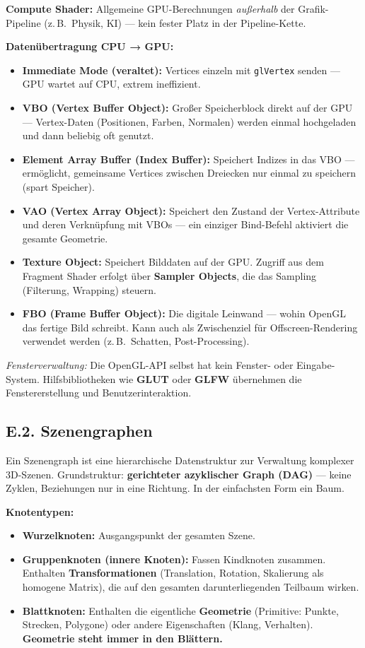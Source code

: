 \documentclass[12pt, a4paper]{article}
\begin{document}
\textbf{Compute Shader:} Allgemeine GPU-Berechnungen \textit{außerhalb} der Grafik-Pipeline (z.\,B.\ Physik, KI) — kein fester Platz in der Pipeline-Kette.

\medskip
\textbf{Datenübertragung CPU → GPU:}

\begin{itemize}
  \item \textbf{Immediate Mode (veraltet):} Vertices einzeln mit \texttt{glVertex} senden — GPU wartet auf CPU, extrem ineffizient.
  \item \textbf{VBO (Vertex Buffer Object):} Großer Speicherblock direkt auf der GPU — Vertex-Daten (Positionen, Farben, Normalen) werden einmal hochgeladen und dann beliebig oft genutzt.
  \item \textbf{Element Array Buffer (Index Buffer):} Speichert Indizes in das VBO — ermöglicht, gemeinsame Vertices zwischen Dreiecken nur einmal zu speichern (spart Speicher).
  \item \textbf{VAO (Vertex Array Object):} Speichert den Zustand der Vertex-Attribute und deren Verknüpfung mit VBOs — ein einziger Bind-Befehl aktiviert die gesamte Geometrie.
  \item \textbf{Texture Object:} Speichert Bilddaten auf der GPU. Zugriff aus dem Fragment Shader erfolgt über \textbf{Sampler Objects}, die das Sampling (Filterung, Wrapping) steuern.
  \item \textbf{FBO (Frame Buffer Object):} Die digitale Leinwand — wohin OpenGL das fertige Bild schreibt. Kann auch als Zwischenziel für Offscreen-Rendering verwendet werden (z.\,B.\ Schatten, Post-Processing).
\end{itemize}

\textit{Fensterverwaltung:} Die OpenGL-API selbst hat kein Fenster- oder Eingabe-System. Hilfsbibliotheken wie \textbf{GLUT} oder \textbf{GLFW} übernehmen die Fenstererstellung und Benutzerinteraktion.

\subsection*{E.2. Szenengraphen}

Ein Szenengraph ist eine hierarchische Datenstruktur zur Verwaltung komplexer 3D-Szenen. Grundstruktur: \textbf{gerichteter azyklischer Graph (DAG)} — keine Zyklen, Beziehungen nur in eine Richtung. In der einfachsten Form ein Baum.

\textbf{Knotentypen:}
\begin{itemize}
  \item \textbf{Wurzelknoten:} Ausgangspunkt der gesamten Szene.
  \item \textbf{Gruppenknoten (innere Knoten):} Fassen Kindknoten zusammen. Enthalten \textbf{Transformationen} (Translation, Rotation, Skalierung als homogene Matrix), die auf den gesamten darunterliegenden Teilbaum wirken.
  \item \textbf{Blattknoten:} Enthalten die eigentliche \textbf{Geometrie} (Primitive: Punkte, Strecken, Polygone) oder andere Eigenschaften (Klang, Verhalten). \textbf{Geometrie steht immer in den Blättern.}
\end{itemize}
\end{document}
